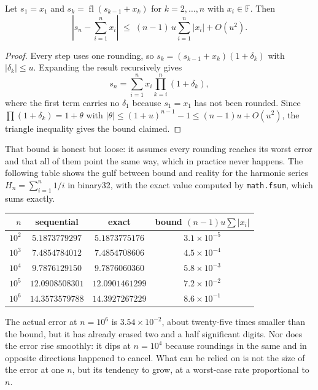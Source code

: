 \begin{teorema}
Let $s_{1}=x_{1}$ and $s_{k}=\operatorname{fl}(s_{k-1}+x_{k})$ for
$k=2,\dots,n$ with $x_{i}\in\mathbb{F}$. Then
\[
  \left|s_{n}-\sum_{i=1}^{n}x_{i}\right|
  \;\le\;(n-1)\,u\sum_{i=1}^{n}|x_{i}|+O(u^{2}).
\]
\end{teorema}

\begin{proof}
Every step uses one rounding, so $s_{k}=(s_{k-1}+x_{k})(1+\delta_{k})$
with $|\delta_{k}|\le u$. Expanding the result recursively gives
\[
  s_{n}=\sum_{i=1}^{n}x_{i}\prod_{k=i}^{n}(1+\delta_{k}),
\]
where the first term carries no $\delta_{1}$ because $s_{1}=x_{1}$ has not been rounded.
Since $\prod(1+\delta_{k})=1+\theta$ with
$|\theta|\le(1+u)^{n-1}-1\le(n-1)u+O(u^{2})$, the triangle inequality gives the bound
claimed.
\end{proof}

That bound is honest but loose: it assumes every rounding reaches its
worst error and that all of them point the same way, which in practice never happens.
The following table shows the gulf between bound and reality for the harmonic series
$H_{n}=\sum_{i=1}^{n}1/i$ in binary32, with the exact value computed by
\texttt{math.fsum}, which sums exactly.

\begin{center}
\begin{tabular}{rccc}
\hline
$n$ & sequential & exact & bound $(n-1)u\sum|x_{i}|$ \\
\hline
$10^{2}$  & $5.1873779297$ & $5.1873775176$ & $3.1\times10^{-5}$ \\
$10^{3}$  & $7.4854784012$ & $7.4854708606$ & $4.5\times10^{-4}$ \\
$10^{4}$  & $9.7876129150$ & $9.7876060360$ & $5.8\times10^{-3}$ \\
$10^{5}$  & $12.0908508301$ & $12.0901461299$ & $7.2\times10^{-2}$ \\
$10^{6}$  & $14.3573579788$ & $14.3927267229$ & $8.6\times10^{-1}$ \\
\hline
\end{tabular}
\end{center}

The actual error at $n=10^{6}$ is $3.54\times10^{-2}$, about twenty-five
times smaller than the bound, but it has already erased two and a half significant
digits. Nor does the error rise smoothly: it dips at $n=10^{4}$ because roundings in the
same and in opposite directions happened to cancel. What can be relied on is not the
size of the error at one $n$, but its tendency to grow, at a worst-case rate
proportional to $n$.

